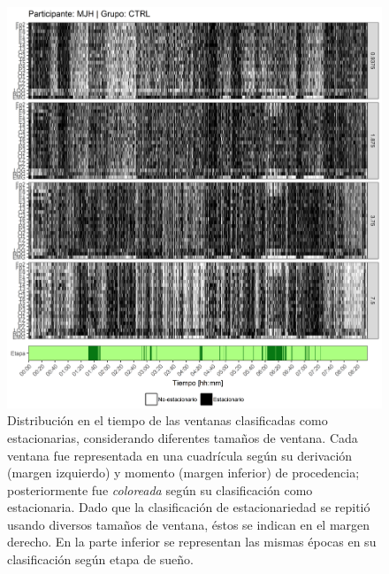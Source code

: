 \documentclass[12pt,letterpaper,draft]{book}
\begin{document}
\begin{figure}
\centering
\includegraphics[width=\linewidth]
{./scripts_graf_res/MJH_patrones_1.png}
\caption[Distribución en el tiempo de las ventanas clasificadas como estacionarias, considerando diferentes tamaños de ventana]{Distribución en el tiempo de las ventanas clasificadas como estacionarias, considerando diferentes tamaños de ventana. 
Cada ventana fue representada en una cuadrícula según su derivación (margen izquierdo) y momento (margen inferior) de procedencia; posteriormente fue \textit{coloreada} según su clasificación como estacionaria.
Dado que la clasificación de estacionariedad se repitió usando diversos tamaños de ventana, éstos se indican en el margen derecho.
En la parte inferior se representan las mismas épocas en su clasificación según etapa de sueño.}
\end{figure}
\end{document}
